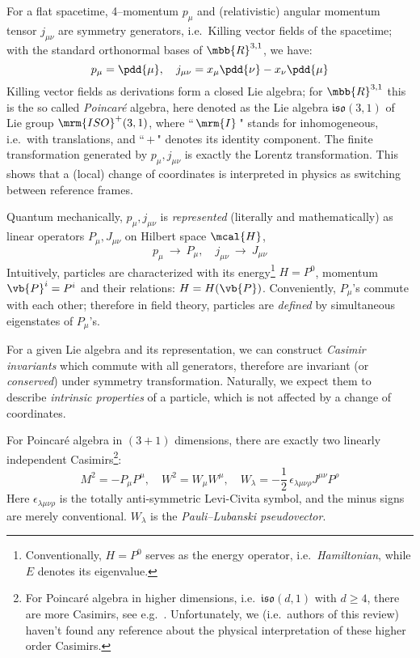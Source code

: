 \documentclass[a4paper,11pt]{article}
\begin{document}
	For a flat spacetime, 4--momentum $p_\mu$ and (relativistic) angular momentum tensor $j_{\mu\nu}$ are symmetry generators, i.e.~Killing vector fields of the spacetime; with the standard orthonormal bases of $\mbb{R}^{3,1}$, we have:
	\begin{equation}
		p_\mu = \pdd{\mu},\quad
		j_{\mu\nu} = x_\mu \pdd{\nu} - x_\nu \pdd{\mu}
	\end{equation}
	Killing vector fields as derivations form a closed Lie algebra; for $\mbb{R}^{3,1}$ this is the so called \textit{Poincar\'e} algebra, here denoted as the Lie algebra $\mathfrak{iso}(3,1)$ of Lie group $\mrm{ISO}^+(3,1)$,  where ``\,$\mrm{I}$\," stands for inhomogeneous, i.e.~with translations, and ``\,$+$\," denotes its identity component. The finite transformation generated by $p_\mu, j_{\mu\nu}$ is exactly the Lorentz transformation. This shows that a (local) change of coordinates is interpreted in physics as switching between reference frames. 
	
	Quantum mechanically, $p_\mu, j_{\mu\nu}$ is \textit{represented} (literally and mathematically) as linear operators $P_\mu, J_{\mu\nu}$ on Hilbert space $\mcal{H}$,
	\begin{equation}
		p_\mu\ \longrightarrow\ P_\mu,\quad
		j_{\mu\nu}\ \longrightarrow\ J_{\mu\nu}
	\end{equation}
	Intuitively, particles are characterized with its energy\footnote{
		Conventionally, $H = P^0$ serves as the energy operator, i.e.~\textit{Hamiltonian}, while $E$ denotes its eigenvalue. 
	} $H = P^0$, momentum $\vb{P}^i = P^i$ and their relations: $H = H(\vb{P})$. Conveniently, $P_\mu$'s commute with each other; therefore in field theory, particles are \textit{defined} by simultaneous eigenstates of $P_\mu$'s. 
	
	For a given Lie algebra and its representation, we can construct \textit{Casimir invariants} which commute with all generators, therefore are invariant (or \textit{conserved}) under symmetry transformation. Naturally, we expect them to describe \textit{intrinsic properties} of a particle, which is not affected by a change of coordinates. 
	
	For Poincar\'e algebra in $(3+1)$ dimensions, there are exactly two linearly independent Casimirs\footnote{
		For Poincar\'e algebra in higher dimensions, i.e.~$\mathfrak{iso}(d,1)$ with $d\ge 4$, there are more Casimirs, see e.g.~\cite{Bekaert:2006py}. Unfortunately, we (i.e.~authors of this review) haven't found any reference about the physical interpretation of these higher order Casimirs. 
	}:
	\begin{equation}
		M^2 = -P_\mu P^\mu,\quad
		W^2 = W_\mu W^\mu,\quad
		W_\lambda = -\frac{1}{2}\,
			\epsilon_{\lambda\mu\nu\rho}
			J^{\mu\nu} P^\rho
	\end{equation}
	Here $\epsilon_{\lambda\mu\nu\rho}$ is the totally anti-symmetric Levi-Civita symbol, and the minus signs are merely conventional. $W_\lambda$ is the \textit{Pauli–Lubanski pseudovector}. 
	
\end{document}
